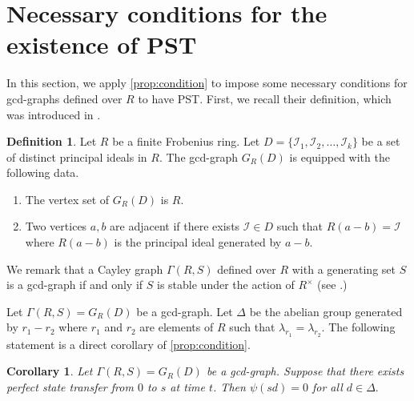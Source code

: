 \documentclass[12pt, a4paper]{amsart}
\newtheorem{cor}[thm]{Corollary}
\theoremstyle{definition}
\newtheorem{definition}[thm]{Definition}
\numberwithin{equation}{section}
\begin{document}
\section{\textbf{Necessary conditions for the existence of PST}} \label{sec:necessary_conditions}
In this section, we apply \cref{prop:condition} to impose some necessary conditions for gcd-graphs defined over $R$ to have PST. First, we recall their definition, which was introduced in \cite{nguyen2025gcd}.
\begin{definition}
Let $R$ be a finite Frobenius ring. Let $D= \{\mathcal{I}_1, \mathcal{I}_2, \ldots, \mathcal{I}_k \}$ be a set of distinct principal ideals in $R.$ The gcd-graph $G_{R}(D)$ is equipped with the following data.
\begin{enumerate}
    \item The vertex set of $G_{R}(D)$ is $R.$
    \item Two vertices $a,b$ are adjacent if there exists $\mathcal{I} \in D$ such that $R(a-b)= \mathcal{I}$ where $R(a-b)$ is the principal ideal generated by $a-b.$
\end{enumerate}
\end{definition}
We remark that a Cayley graph $\Gamma(R,S)$ defined over $R$ with a generating set $S$ is a gcd-graph if and only if $S$ is stable under the action of $R^{\times}$ (see \cite[Proposition 2.5]{nguyen2025gcd}.)  

Let $\Gamma(R,S) = G_{R}(D)$ be a gcd-graph. Let $\Delta$ be the abelian group generated by $r_1-r_2$ where $r_1$ and $r_2$ are elements of $R$ such that $\lambda_{r_1} = \lambda_{r_2}$. 
The following statement is a direct corollary of \cref{prop:condition}. 


\begin{cor} \label{cor:orthogonal}
Let $\Gamma(R,S) = G_{R}(D)$ be a gcd-graph.   Suppose that there exists  perfect state transfer from $0$ to $s$ at time $t$. Then $\psi(sd)=0$ for all $d \in \Delta.$
\end{cor}
\end{document}
